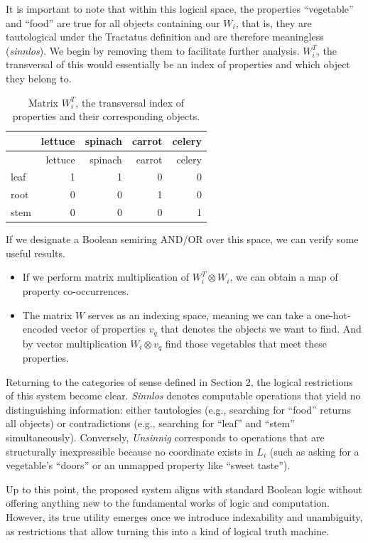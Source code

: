 \documentclass{article}
\providecommand{\tightlist}{%
  \setlength{\itemsep}{0pt}\setlength{\parskip}{0pt}}
\begin{document}
It is important to note that within this logical space, the properties
``vegetable'' and ``food'' are true for all objects containing our
\(W_i\), that is, they are tautological under the Tractatus definition
and are therefore meaningless (\emph{sinnlos}). We begin by removing
them to facilitate further analysis. \(W^{T}_i\), the transversal of
this would essentially be an index of properties and which object they
belong to.

\begin{longtable}[]{@{}lrrrr@{}}
\caption{Matrix \(W^{T}_i\), the transversal index of properties and
their corresponding objects.}\tabularnewline
\toprule
& lettuce & spinach & carrot & celery \\
\midrule
\endfirsthead
\toprule
& lettuce & spinach & carrot & celery \\
\midrule
\endhead
leaf & 1 & 1 & 0 & 0 \\
root & 0 & 0 & 1 & 0 \\
stem & 0 & 0 & 0 & 1 \\
\bottomrule
\end{longtable}

If we designate a Boolean semiring AND/OR over this space, we can verify
some useful results.

\begin{itemize}
\tightlist
\item
  If we perform matrix multiplication of \(W^T_i \otimes W_i\), we can
  obtain a map of property co-occurrences.
\item
  The matrix \(W\) serves as an indexing space, meaning we can take a
  one-hot-encoded vector of properties \(v_q\) that denotes the objects
  we want to find. And by vector multiplication \(W_i \otimes v_q\) find
  those vegetables that meet these properties.
\end{itemize}

Returning to the categories of sense defined in Section 2, the logical
restrictions of this system become clear. \emph{Sinnlos} denotes
computable operations that yield no distinguishing information: either
tautologies (e.g., searching for ``food'' returns all objects) or
contradictions (e.g., searching for ``leaf'' and ``stem''
simultaneously). Conversely, \emph{Unsinnig} corresponds to operations
that are structurally inexpressible because no coordinate exists in
\(L_i\) (such as asking for a vegetable's ``doors'' or an unmapped
property like ``sweet taste'').

Up to this point, the proposed system aligns with standard Boolean logic
without offering anything new to the fundamental works of logic and
computation. However, its true utility emerges once we introduce
indexability and unambiguity, as restrictions that allow turning this
into a kind of logical truth machine.
\end{document}

